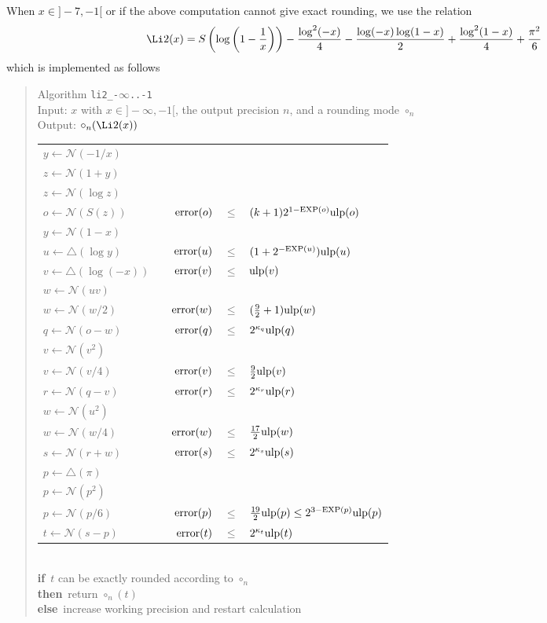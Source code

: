 \documentclass[12pt]{amsart}
\def\n{\textnormal}
\def\pinf{\bigtriangleup}
\def\ulp{{\rm ulp}}
\def\Exp{{\rm EXP}}
\def\N{{\mathcal N}}
\def\If{{\bf if}}
\def\then{{\bf then}}
\def\Else{{\bf else}}
\begin{document}
When $x \in ]-7, -1[$ or if the above computation cannot give exact rounding,
we use the relation
\[
\Li2(x) = S\left(\log\left(1-\frac{1}{x}\right)\right) - \frac{\log^2(-x)}{4}
- \frac{\log(-x) \log(1 - x)}{2} + \frac{\log^2(1-x)}{4} + \frac{\pi^2}{6}
\]
which is implemented as follows
\begin{quote}
Algorithm {\tt li2\_-$\infty$..-1}\\
Input: $x$ with $x \in ]-\infty, -1[$, the output precision $n$,
    and a rounding mode $\circ_n$ \\
Output: $\circ_n(\Li2(x))$ \\
\begin{tabular}{l c r c l}
$y \leftarrow \N(-1/x)$\\
$z \leftarrow \N(1+y)$\\
$z \leftarrow \N(\log z)$\\
$o \leftarrow \N(S(z))$ & & 
$\n{error}(o)$ & $\leq$ & $(k+1)2^{1-\Exp(o)}\ulp(o)$\\

$y \leftarrow \N(1-x)$\\
$u \leftarrow \pinf(\log y)$ & &
$\n{error}(u)$ & $\leq$ & $(1+2^{-\Exp(u)})\ulp(u)$\\
$v \leftarrow \pinf(\log(-x))$ & & $\n{error}(v)$ & $\leq$ & $\ulp(v)$\\
$w \leftarrow \N(uv)$\\
$w \leftarrow \N(w/2)$ & &
$\n{error}(w)$ & $\leq$ & $(\frac{9}{2}+1)\ulp(w)$\\
$q \leftarrow \N(o-w)$ & & $\n{error}(q)$ & $\leq$ & $2^{\kappa_q}\ulp(q)$\\

$v \leftarrow \N(v^2)$\\
$v \leftarrow \N(v/4)$ & & $\n{error}(v)$ & $\leq$ & $\frac{9}{2}\ulp(v)$\\
$r \leftarrow \N(q-v)$ & & $\n{error}(r)$ & $\leq$ & $2^{\kappa_r}\ulp(r)$\\

$w \leftarrow \N(u^2)$\\
$w \leftarrow \N(w/4)$ & &
$\n{error}(w)$ & $\leq$ & $\frac{17}{2}\ulp(w)$\\
$s \leftarrow \N(r+w)$ & &
$\n{error}(s)$ & $\leq$ & $2^{\kappa_s}\ulp(s)$\\

$p \leftarrow \pinf(\pi)$ \\
$p \leftarrow \N(p^2)$ \\
$p \leftarrow \N(p/6)$ & &
$\n{error}(p) $ & $ \leq $ & $\frac{19}{2}\ulp(p) \leq 2^{3-\Exp(p)}\ulp(p)$\\
$t \leftarrow \N(s - p)$ & &
$\n{error}(t) $ & $ \leq $ & $2^{\kappa_t} \ulp(t)$
\end{tabular}\\
\If\ $t$ can be exactly rounded according to $\circ_n$\\
\then\ return $\circ_n(t)$\\
\Else\ increase working precision and restart calculation
\end{quote}
\end{document}
